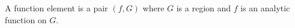 A function element is a pair $(f, G)$ where $G$ is a region and $f$ is an analytic function on $G$.
